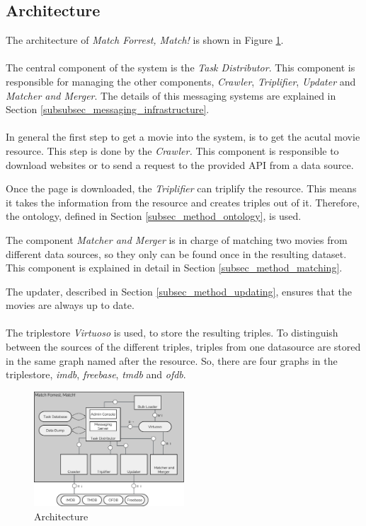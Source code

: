 \subsection{Architecture}
\label{subsec_method_architecture}

The architecture of \emph{Match Forrest, Match!} is shown in Figure \ref{fig_architecture}.
\\ \\
The central component of the system is the \textit{Task Distributor}.
This component is responsible for managing the other components, \textit{Crawler}, \textit{Triplifier}, \textit{Updater} and \textit{Matcher and Merger}.
The details of this messaging systems are explained in Section \ref{subsubsec_messaging_infrastructure}.
\\ \\
In general the first step to get a movie into the system, is to get the acutal movie resource.
This step is done by the \textit{Crawler.}
This component is responsible to download websites or to send a request to the provided API from a data source.

Once the page is downloaded, the \textit{Triplifier} can triplify the resource.
This means it takes the information from the resource and creates triples out of it.
Therefore, the ontology, defined in Section \ref{subsec_method_ontology}, is used.

The component \textit{Matcher and Merger} is in charge of matching two movies from different data sources, so they only can be found once in the resulting dataset.
This component is explained in detail in Section \ref{subsec_method_matching}.

The updater, described in Section \ref{subsec_method_updating}, ensures that the movies are always up to date.
\\ \\
The triplestore \textit{Virtuoso} is used, to store the resulting triples.
To distinguish between the sources of the different triples, triples from one datasource are stored in the same graph named after the resource.
So, there are four graphs in the triplestore, \textit{imdb}, \textit{freebase}, \textit{tmdb} and \textit{ofdb}.

\begin{figure}[ht]
  \begin{center}
  \includegraphics[width=0.5\textwidth]{images/architecture.pdf}
  \end{center}
  \caption{Architecture}
  \label{fig_architecture}
\end{figure}

